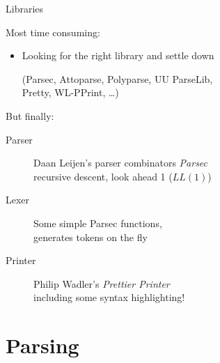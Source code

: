 \begin{frame}{Libraries}

  Most time consuming:

  \begin{itemize}
    \item Looking for the right library and settle down

    (Parsec, Attoparse, Polyparse, UU ParseLib, \\
     Pretty, WL-PPrint, \ldots)
  \end{itemize}

  \pause
  But finally:

  \begin{description}
    \item[Parser]  Daan Leijen's parser combinators \emph{Parsec}\\
                   recursive descent, look ahead 1 ($LL(1)$)
    \item[Lexer]   Some simple Parsec functions,\\
                   generates tokens on the fly
    \item[Printer] Philip Wadler's \emph{Prettier Printer}\\
                   including some syntax highlighting!
  \end{description}

\end{frame}

\section{Parsing}
\subsection*{}

